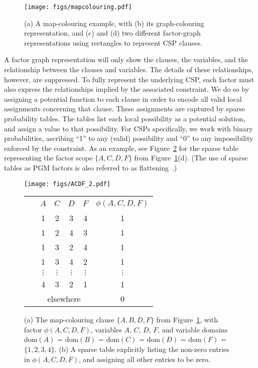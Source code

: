 \documentclass{ieeeaccess}
\newcommand\Tstrut{\rule{0pt}{2.6ex}}         %
\begin{document}
\begin{figure}[h!]
	\centering
	\texttt{[image: figs/mapcolouring.pdf]}
	\caption{ (a) A map-colouring example, with (b) its graph-colouring representation, and (c) and (d) two different factor-graph representations using rectangles to represent CSP clauses.
	}\label{fig-mapcolouring}
\end{figure}

A factor graph representation will only show the clauses, the variables, and the relationship between the clauses and variables. The details of these relationships, however, are suppressed. To fully represent the underlying CSP, each factor must also express the relationships implied by the associated constraint. We do so by assigning a potential function to each clause in order to encode all valid local assignments concerning that clause. These assignments are captured by sparse probability tables. The tables list each local possibility as a potential solution, and assign a value to that possibility. For CSPs specifically, we work with binary probabilities, ascribing ``1'' to any (valid) possibility and ``0'' to any impossibility enforced by the constraint. As an example, see Figure~\ref{fig-probtable} for the sparse table representing the factor scope $\{A,C,D,F\}$ from Figure~\ref{fig-mapcolouring}(d). (The use of sparse tables as PGM factors is also referred to as flattening~\cite{dechter2010on}.)
\begin{figure}[h]
	\centering
	\hspace{-1em}\texttt{[image: figs/ACDF\_2.pdf]}
	\\$\ $\\
	\vspace{-0.82em}
	\begin{tabular}{r c c c c |c }
		~& $A$ & $C$ & $D$ & $F$ & $\phi(A,C,D,F)$  \\
		\cline{2-6}
		& 1\Tstrut & 2 & 3 & 4 & 1 \\
		& 1 & 2 & 4 & 3 & 1 \\
		& 1 & 3 & 2 & 4 & 1 \\
		& 1 & 3 & 4 & 2 & 1 \\
		& $\vdots$ & $\vdots$ & $\vdots$ & $\vdots$ & $\vdots$ \\
		& 4 & 3 & 2 & 1 & 1 \\
		\cline{2-6}
		& \multicolumn{4}{c|}{elsewhere\Tstrut} & 0 
	\end{tabular}
	\vspace{0.1em}
	\caption{(a) The map-colouring clause $\{A,B,D,F\}$ from Figure~\ref{fig-mapcolouring}, with factor $\phi(A, C, D, F)$, variables $A$,  $C$, $D$, $F$, and variable domains $\text{dom}(A)$ = $\text{dom}(B)$ = $\text{dom}(C)$ = $\text{dom}(D)$ = $\text{dom}(F)$ = $\{1,2,3,4\}$. (b) A sparse table explicitly listing the non-zero entries in $\phi(A, C, D, F)$, and assigning all other entries to be zero.}
	\label{fig-probtable}
\end{figure}
\end{document}
